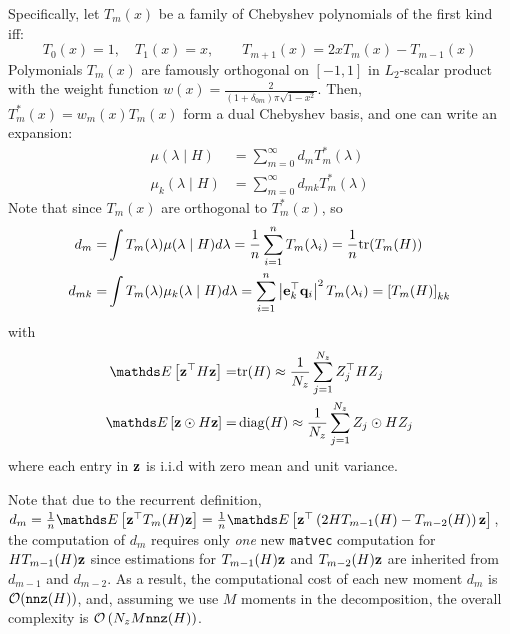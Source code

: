 \documentclass{mynotes}
\begin{document}
Specifically, let \( T_m(x) \) be a family of Chebyshev polynomials of the first kind iff:
\begin{equation}
      T_0(x) = 1, \quad T_1(x) = x, \qquad T_{m+1}(x) = 2x T_m(x) - T_{m-1}(x) 
\end{equation}
Polymonials \( T_m(x) \) are famously orthogonal on \( [-1, 1] \) in \(L_2\)-scalar product with the weight function \( w(x) = \frac{2}{(1+\delta_{0m})\pi \sqrt{1-x^2}}\). Then, \( T^*_m(x) = w_m(x) T_m(x)\) form a dual Chebyshev basis, and one can write an expansion:
\begin{equation}
      \begin{aligned}
            \mu( \lambda \mid H ) & = \sum_{m=0}^{\infty} d_m T^*_m(\lambda)     \\
            \mu_k( \lambda \mid H ) & = \sum_{m=0}^{\infty} d_{mk} T^*_m(\lambda)   
      \end{aligned}
\end{equation}
Note that since \( T_m(x) \) are orthogonal to \( T^*_m(x) \), so 
\begin{equation}
      \begin{aligned}
            d_m = & \int T_m(\lambda) \mu(\lambda \mid H) d\lambda = \frac{1}{n} \sum_{i=1}^n T_m(\lambda_i) = \frac{1}{n} \mathrm{tr} (T_m(H)) \\
            d_{mk} = & \int T_m(\lambda) \mu_k(\lambda \mid H) d\lambda = \sum_{i=1}^n \left| \mathbf{e}_k^\top \mathbf{q}_i \right|^2 T_m(\lambda_i) = \left[ T_m( H ) \right]_{kk}
      \end{aligned}
\end{equation}
with 
\begin{equation}
      \begin{aligned}
            \ds E \left[ \b z^\top H \b z \right] = & \mathrm{tr}(H) \approx \frac{1}{N_z} \sum_{j=1}^{N_z} Z_j^\top H Z_j \\
            \ds E \left[ \b z \odot H \b z \right] = & \diag ( H ) \approx \frac{1}{N_z} \sum_{j=1}^{N_z} Z_j \odot H Z_j  
      \end{aligned}
\end{equation}
where each entry in \( \mathbf{z} \) is i.i.d with zero mean and unit variance. 

Note that due to the recurrent definition, \( d_m = \frac{1}{n} \ds E \left[ \b z^\top T_m(H) \b z \right] = \frac{1}{n} \ds E \left[ \b z^\top \left( 2 H T_{m-1}(H) - T_{m-2}(H) \right) \b z \right] \), the computation of \( d_m \) requires only \emph{one} new \texttt{matvec} computation for \( H T_{m-1}(H) \mathbf{z} \) since estimations for \( T_{m-1}(H) \mathbf{z} \) and \( T_{m-2}(H) \mathbf{z} \) are inherited from \( d_{m-1} \) and \( d_{m-2}\). As a result, the computational cost of each new moment \( d_m \) is \( \mathcal{O}( \texttt{nnz}(H))\), and, assuming we use \( M \) moments in the decomposition, the overall complexity is \( \mathcal{O} \left( N_z M \texttt{nnz}(H)  \right)\).
\end{document}
